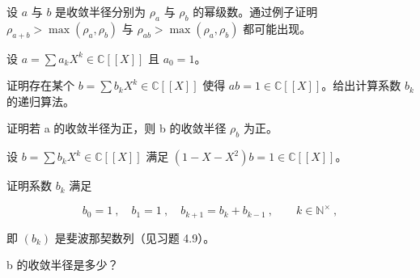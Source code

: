\begin{exercises}
\item

设 $a$ 与 $b$ 是收敛半径分别为 $\rho_a$ 与 $\rho_b$ 的幂级数。通过例子证明 $\rho_{a+b} > \max(\rho_a, \rho_b)$ 与 $\rho_{ab} > \max(\rho_a, \rho_b)$ 都可能出现。

\item

设  $ a = \sum a_k X^k \in \mathbb{C}[\![X]\!] $ 且  $ a_0 = 1 $。

\begin{items}
\item

证明存在某个  $ b = \sum b_k X^k \in \mathbb{C}[\![X]\!] $ 使得  $ ab = 1 \in \mathbb{C}[\![X]\!] $。给出计算系数  $ b_k $ 的递归算法。

\item

证明若 a 的收敛半径为正，则 b 的收敛半径  $ \rho_{b} $ 为正。

\end{items}

\item

设  $ b = \sum b_k X^k \in \mathbb{C}[\![X]\!] $ 满足  $ (1 - X - X^2)b = 1 \in \mathbb{C}[\![X]\!] $。

\begin{items}
\item

证明系数  $ b_{k} $ 满足

\[
b_{0}=1~,\quad b_{1}=1~,\quad b_{k+1}=b_{k}+b_{k-1}~,\qquad k\in\mathbb{N}^{\times}~,\nonumber
\]

即  $ (b_{k}) $ 是斐波那契数列（见习题 4.9）。

\item

b 的收敛半径是多少？

\end{items}

\end{exercises}
